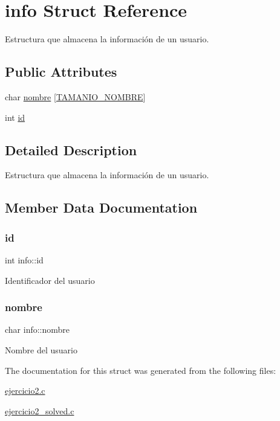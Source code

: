 \hypertarget{structinfo}{}\section{info Struct Reference}
\label{structinfo}


Estructura que almacena la información de un usuario.  


\subsection*{Public Attributes}
\begin{DoxyCompactItemize}
\item 
char \mbox{\hyperlink{structinfo_a3fabfdb9002c8d356ddaa529a4bc473f}{nombre}} \mbox{[}\mbox{\hyperlink{ejercicio2__solved_8c_adc9a965ddfa49420375f71c462043e5a}{T\+A\+M\+A\+N\+I\+O\+\_\+\+N\+O\+M\+B\+RE}}\mbox{]}
\item 
int \mbox{\hyperlink{structinfo_afe86f23d8bd5fd8d139e39a5b1a01171}{id}}
\end{DoxyCompactItemize}


\subsection{Detailed Description}
Estructura que almacena la información de un usuario. 

\subsection{Member Data Documentation}
\mbox{\label{structinfo_afe86f23d8bd5fd8d139e39a5b1a01171}} 
\subsubsection{\texorpdfstring{id}{id}}
{\footnotesize\ttfamily int info\+::id}

Identificador del usuario \mbox{\label{structinfo_a3fabfdb9002c8d356ddaa529a4bc473f}} 
\subsubsection{\texorpdfstring{nombre}{nombre}}
{\footnotesize\ttfamily char info\+::nombre}

Nombre del usuario 

The documentation for this struct was generated from the following files\+:\begin{DoxyCompactItemize}
\item 
\mbox{\hyperlink{ejercicio2_8c}{ejercicio2.\+c}}\item 
\mbox{\hyperlink{ejercicio2__solved_8c}{ejercicio2\+\_\+solved.\+c}}\end{DoxyCompactItemize}
